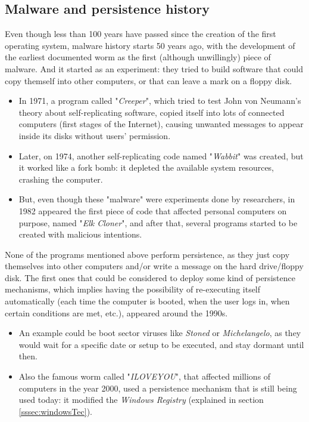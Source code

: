 \subsection{Malware and persistence history}
\label{ssec:history}
Even though less than 100 years have passed since the creation of the first operating system, malware history starts 50 years ago, with the development of the earliest documented worm as the first (although unwillingly) piece of malware. And it started as an experiment: they tried to build software that could copy themself into other computers, or that can leave a mark on a floppy disk. 

\begin{itemize}
\renewcommand{\labelitemi}{\localtextbulletone}
\item In 1971, a program called "\textit{Creeper}", which tried to test John von Neumann's theory about self-replicating software, copied itself into lots of connected computers (first stages of the Internet), causing unwanted messages to appear inside its disks without users' permission. 
\item Later, on 1974, another self-replicating code named "\textit{Wabbit}" was created, but it worked like a fork bomb\footnotemark{}: it depleted the available system resources, crashing the computer. 
\item But, even though these "malware" were experiments done by researchers, in 1982 appeared the first piece of code that affected personal computers on purpose, named "\textit{Elk Cloner}", and after that, several programs started to be created with malicious intentions.
\end{itemize}

None of the programs mentioned above perform persistence, as they just copy themselves into other computers and/or write a message on the hard drive/floppy disk. The first ones that could be considered to deploy some kind of persistence mechanisms, which implies having the possibility of re-executing itself automatically (each time the computer is booted, when the user logs in, when certain conditions are met, etc.), appeared around the 1990s. 

\begin{itemize}
\renewcommand{\labelitemi}{\localtextbulletone}
\item An example could be boot sector viruses like \textit{Stoned} or \textit{Michelangelo}, as they would wait for a specific date or setup to be executed, and stay dormant until then.

\pagebreak
\item Also the famous worm
called "\textit{ILOVEYOU}", that affected millions of computers in the year 2000, used a persistence mechanism that is still being used today: it modified the \textit{Windows Registry} (explained in section \ref{sssec:windowsTec}).
\end{itemize}

